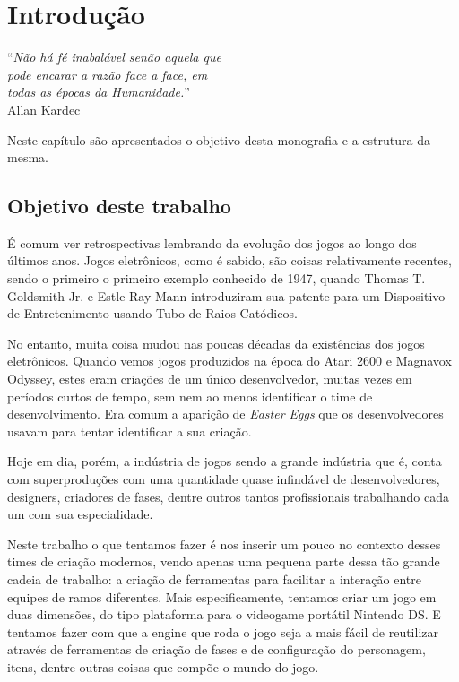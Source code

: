 \documentclass[brazil]{abnt}
\begin{document}
\tableofcontents{}
\listoffigures
\listoftables

\chapter{Introdução\label{cap:introducao}}

\vfill{}
\begin{flushright}{}``\emph{Não há fé inabalável senão aquela que}\\
\emph{pode encarar a razão face a face, em}\\
\emph{todas as épocas da Humanidade.}''\\
{\small Allan Kardec}\end{flushright}{\small \par}
\vfill{}

Neste capítulo são apresentados o objetivo desta monografia e a estrutura
da mesma.
\newpage


\section{Objetivo deste trabalho}

É comum ver retrospectivas lembrando da evolução dos jogos ao longo dos últimos anos. Jogos eletrônicos, como é sabido, são coisas relativamente recentes, sendo o primeiro o primeiro exemplo conhecido de 1947, quando Thomas T. Goldsmith Jr. e Estle Ray Mann introduziram sua patente para um Dispositivo de Entretenimento usando Tubo de Raios Catódicos.

No entanto, muita coisa mudou nas poucas décadas da existências dos jogos eletrônicos. Quando vemos jogos produzidos na época do Atari 2600 e Magnavox Odyssey, estes eram criações de um único desenvolvedor, muitas vezes em períodos curtos de tempo, sem nem ao menos identificar o time de desenvolvimento. Era comum a aparição de \textit{Easter Eggs} que os desenvolvedores usavam para tentar identificar a sua criação.

Hoje em dia, porém, a indústria de jogos sendo a grande indústria que é, conta com superproduções com uma quantidade quase infindável de desenvolvedores, designers, criadores de fases, dentre outros tantos profissionais trabalhando cada um com sua especialidade.

Neste trabalho o que tentamos fazer é nos inserir um pouco no contexto desses times de criação modernos, vendo apenas uma pequena parte dessa tão grande cadeia de trabalho: a criação de ferramentas para facilitar a interação entre equipes de ramos diferentes. Mais especificamente, tentamos criar um jogo em duas dimensões, do tipo plataforma para o videogame portátil Nintendo DS. E tentamos fazer com que a engine que roda o jogo seja a mais fácil de reutilizar através de ferramentas de criação de fases e de configuração do personagem, itens, dentre outras coisas que compõe o mundo do jogo.
\end{document}
